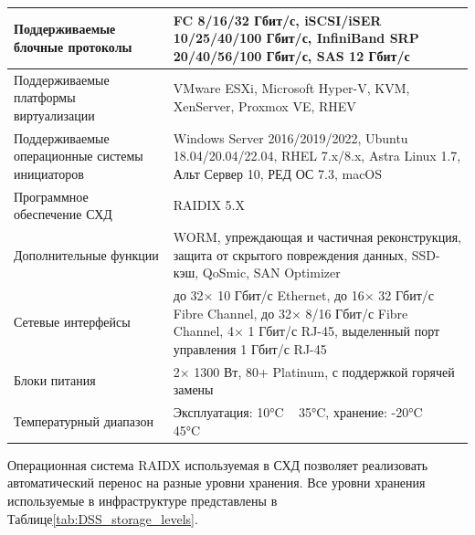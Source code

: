 \documentclass[14pt, a4paper]{extarticle}
\begin{document}
\begin{tabularx}{\textwidth}{|l|X|}
  Поддерживаемые блочные протоколы                & FC 8/16/32 Гбит/с, iSCSI/iSER 10/25/40/100 Гбит/с, InfiniBand SRP 20/40/56/100 Гбит/с, SAS 12 Гбит/с                                                      \\\hline
  Поддерживаемые платформы виртуализации          & VMware ESXi, Microsoft Hyper-V, KVM, XenServer, Proxmox VE, RHEV                                                                                          \\\hline
  Поддерживаемые операционные системы инициаторов & Windows Server 2016/2019/2022, Ubuntu 18.04/20.04/22.04, RHEL 7.x/8.x, Astra Linux 1.7, Альт Сервер 10, РЕД ОС 7.3, macOS                                 \\\hline
  Программное обеспечение СХД                     & RAIDIX 5.X                                                                                                                                                \\\hline
  Дополнительные функции                          & WORM, упреждающая и частичная реконструкция, защита от скрытого повреждения данных, SSD-кэш, QoSmic, SAN Optimizer                                        \\\hline
  Сетевые интерфейсы                              & до 32× 10 Гбит/с Ethernet, до 16× 32 Гбит/с Fibre Channel, до 32× 8/16 Гбит/с Fibre Channel, 4× 1 Гбит/с RJ-45, выделенный порт управления 1 Гбит/с RJ-45 \\\hline
  Блоки питания                                   & 2× 1300 Вт, 80+ Platinum, с поддержкой горячей замены                                                                                                     \\
  Температурный диапазон                          & Эксплуатация: 10°C ~ 35°C, хранение: -20°C ~ 45°C                                                                                                         \\\hline
\end{tabularx}

Операционная система RAIDX \cite{raidix-web} используемая в СХД позволяет реализовать
автоматический перенос на разные уровни хранения. Все уровни хранения используемые в
инфраструктуре представлены в Таблице\;\ref{tab:DSS_storage_levels}.
\end{document}
